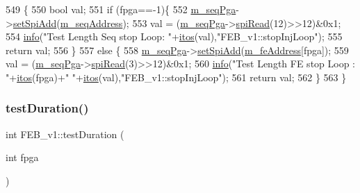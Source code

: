 \begin{DoxyCode}
549                                 \{
550   \textcolor{keywordtype}{bool} val;
551   \textcolor{keywordflow}{if} (fpga==-1)\{
552     \hyperlink{classFEB__v1_a6c7804ac86796f233a8393043adf2e77}{m\_seqPga}->\hyperlink{classSeqPGA_ac998ce3a6d9b5f2e88cc8393f8c1df53}{setSpiAdd}(\hyperlink{classFEB__v1_a1c1eb093fd1733b9510fcf8bc5c7ad08}{m\_seqAddress});
553     val = (\hyperlink{classFEB__v1_a6c7804ac86796f233a8393043adf2e77}{m\_seqPga}->\hyperlink{classSeqPGA_ab3d0e5e5d4014bc7a92588a76b8713d4}{spiRead}(12)>>12)&0x1;
554     \hyperlink{classObject_a644fd329ea4cb85f54fa6846484b84a8}{info}(\textcolor{stringliteral}{"Test Length Seq stop Loop: "}+\hyperlink{Tools_8h_af330027dbdafb9a30768b3613c553e60}{itos}(val),\textcolor{stringliteral}{"FEB\_v1::stopInjLoop"});
555     \textcolor{keywordflow}{return} val;
556   \}
557   \textcolor{keywordflow}{else} \{
558     \hyperlink{classFEB__v1_a6c7804ac86796f233a8393043adf2e77}{m\_seqPga}->\hyperlink{classSeqPGA_ac998ce3a6d9b5f2e88cc8393f8c1df53}{setSpiAdd}(\hyperlink{classFEB__v1_a4e1945c2d5b434125f375e9d0fc6d99f}{m\_feAddress}[fpga]);
559     val = (\hyperlink{classFEB__v1_a6c7804ac86796f233a8393043adf2e77}{m\_seqPga}->\hyperlink{classSeqPGA_ab3d0e5e5d4014bc7a92588a76b8713d4}{spiRead}(3)>>12)&0x1;
560     \hyperlink{classObject_a644fd329ea4cb85f54fa6846484b84a8}{info}(\textcolor{stringliteral}{"Test Length FE stop Loop : "}+\hyperlink{Tools_8h_af330027dbdafb9a30768b3613c553e60}{itos}(fpga)+\textcolor{stringliteral}{" "}+\hyperlink{Tools_8h_af330027dbdafb9a30768b3613c553e60}{itos}(val),\textcolor{stringliteral}{"FEB\_v1::stopInjLoop"});
561     \textcolor{keywordflow}{return} val;
562   \}
563 \}
\end{DoxyCode}
\mbox{\label{classFEB__v1_a7f1db8ca9490172fce7603da9e703dec}} 
\subsubsection{\texorpdfstring{test\+Duration()}{testDuration()}}
{\footnotesize\ttfamily int F\+E\+B\+\_\+v1\+::test\+Duration (\begin{DoxyParamCaption}\item[{int}]{fpga }\end{DoxyParamCaption})}




